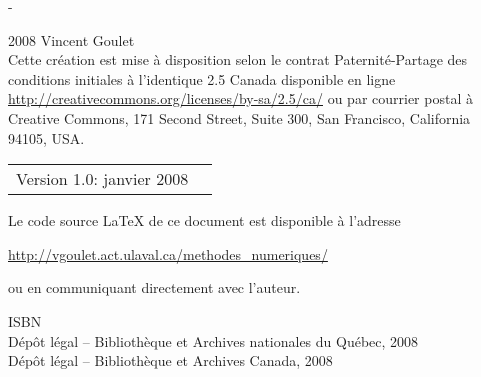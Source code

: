 \begingroup
\calccentering{\unitlength}
\begin{adjustwidth*}{\unitlength}{-\unitlength}
  \small
  \setlength{\parindent}{0pt}
  \setlength{\parskip}{\baselineskip}

  \textcopyright{} 2008 Vincent Goulet \\

  Cette création est mise à disposition selon le contrat
  Paternité-Partage des conditions initiales à l'identique 2.5 Canada
  disponible en ligne
  \url{http://creativecommons.org/licenses/by-sa/2.5/ca/} ou par
  courrier postal à Creative Commons, 171 Second Street, Suite 300,
  San Francisco, California 94105, USA.

  \begin{center}
    \begin{tabular}{ll}
      Version 1.0: janvier 2008 &
    \end{tabular}
  \end{center}

  Le code source {\LaTeX} de ce document est disponible à l'adresse
  \begin{adjustwidth}{\parindent}{\parindent}
    \url{http://vgoulet.act.ulaval.ca/methodes_numeriques/}
  \end{adjustwidth}
  ou en communiquant directement avec l'auteur.

  \vspace{1cm}

  ISBN \ISBN \\
  Dépôt légal -- Bibliothèque et Archives nationales du Québec, 2008 \\
  Dépôt légal -- Bibliothèque et Archives Canada, 2008
\end{adjustwidth*}
\endgroup

\renewcommand{\sfdefault}{phv}


